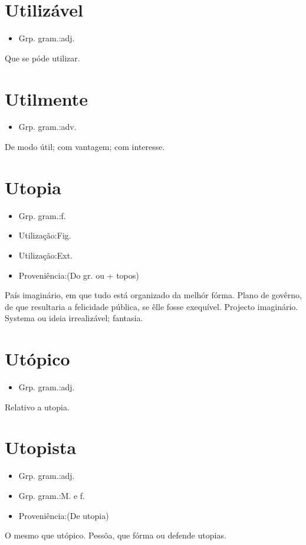 \documentclass{article}
\begin{document}
\section{Utilizável}
\begin{itemize}
\item {Grp. gram.:adj.}
\end{itemize}
Que se póde utilizar.
\section{Utilmente}
\begin{itemize}
\item {Grp. gram.:adv.}
\end{itemize}
De modo útil; com vantagem; com interesse.
\section{Utopia}
\begin{itemize}
\item {Grp. gram.:f.}
\end{itemize}
\begin{itemize}
\item {Utilização:Fig.}
\end{itemize}
\begin{itemize}
\item {Utilização:Ext.}
\end{itemize}
\begin{itemize}
\item {Proveniência:(Do gr. ou + \textunderscore topos\textunderscore )}
\end{itemize}
País imaginário, em que tudo está organizado da melhór fórma.
Plano de govêrno, de que resultaria a felicidade pública, se êlle fosse exequível.
Projecto imaginário.
Systema ou ideia irrealizável; fantasia.
\section{Utópico}
\begin{itemize}
\item {Grp. gram.:adj.}
\end{itemize}
Relativo a utopia.
\section{Utopista}
\begin{itemize}
\item {Grp. gram.:adj.}
\end{itemize}
\begin{itemize}
\item {Grp. gram.:M.  e  f.}
\end{itemize}
\begin{itemize}
\item {Proveniência:(De \textunderscore utopia\textunderscore )}
\end{itemize}
O mesmo que \textunderscore utópico\textunderscore .
Pessôa, que fórma ou defende utopias.
\end{document}
